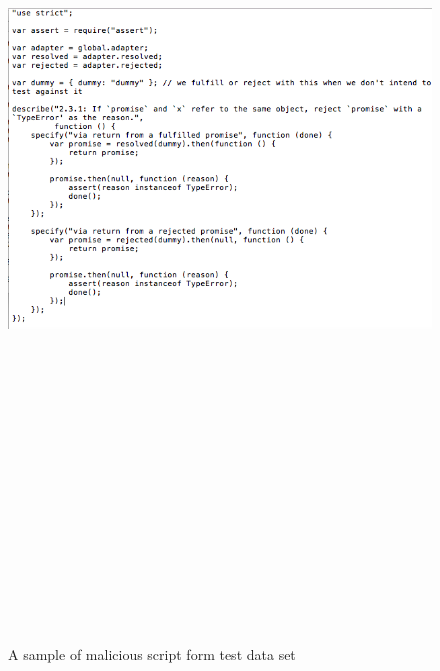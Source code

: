 \begin{figure}[htb]
\centering
\includegraphics[width=15cm,height=25cm,keepaspectratio]{image/benign.png}
\caption[Benign script sample]{A sample of malicious script form test data set} 
\label{fig:benign}
\end{figure}

\newpage

\bigskip

